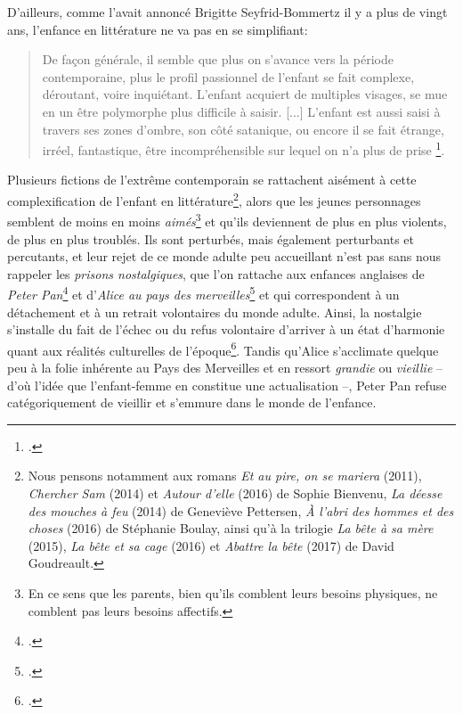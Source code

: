 D'ailleurs, comme l'avait annoncé Brigitte Seyfrid-Bommertz il y a plus de vingt ans, l'enfance en littérature ne va pas en se simplifiant:
\begin{quote}
  \begin{singlespace}
    \small
    De façon générale, il semble que plus on s'avance vers la période contemporaine, plus le profil passionnel de l'enfant se fait complexe, déroutant, voire inquiétant. L'enfant acquiert de multiples visages, se mue en un être polymorphe plus difficile à saisir. [...] L'enfant est aussi saisi à travers ses zones d'ombre, son côté satanique, ou encore il se fait étrange, irréel, fantastique, être incompréhensible sur lequel on n'a plus de prise \footcite[20]{Seyfrid-Bommertz1999}.
    \normalsize
  \end{singlespace}
\end{quote}
Plusieurs fictions de l'extrême contemporain se rattachent aisément à cette complexification de l'enfant en littérature\footnote{Nous pensons notamment aux romans \textit{Et au pire, on se mariera} (2011), \textit{Chercher Sam} (2014) et \textit{Autour d'elle} (2016) de Sophie Bienvenu, \textit{La déesse des mouches à feu} (2014) de Geneviève Pettersen, \textit{À l'abri des hommes et des choses} (2016) de Stéphanie Boulay, ainsi qu'à la trilogie \textit{La bête à sa mère} (2015), \textit{La bête et sa cage} (2016) et \textit{Abattre la bête} (2017) de David Goudreault.}, alors que les jeunes personnages semblent de moins en moins \textit{aimés}\footnote{En ce sens que les parents, bien qu'ils comblent leurs besoins physiques, ne comblent pas leurs besoins affectifs.} et qu'ils deviennent de plus en plus violents, de plus en plus troublés.
Ils sont perturbés, mais également perturbants et percutants, et leur rejet de ce monde adulte peu accueillant n'est pas sans nous rappeler les \textit{prisons nostalgiques}, que l'on rattache aux enfances anglaises de \textit{Peter Pan}\footcite{Barrie1987} et d'\textit{Alice au pays des merveilles}\footcite{Carroll2012} et qui correspondent à un détachement et à un retrait volontaires du monde adulte.
Ainsi, la nostalgie s'installe du fait de l'échec ou du refus volontaire d'arriver à un état d'harmonie quant aux réalités culturelles de l'époque\footcite[241]{Coveney1967}.
Tandis qu'Alice s'acclimate quelque peu à la folie inhérente au Pays des Merveilles et en ressort \textit{grandie} ou \textit{vieillie} -- d'où l'idée que l'enfant-femme en constitue une actualisation --, Peter Pan refuse catégoriquement de vieillir et s'emmure dans le monde de l'enfance.

